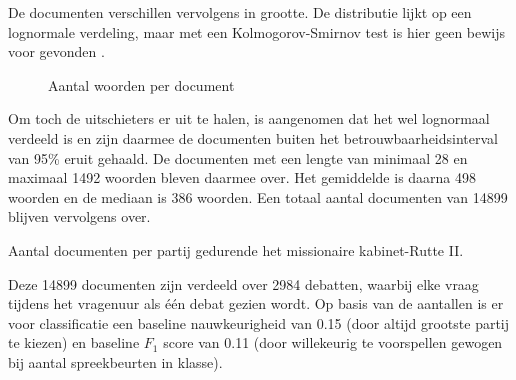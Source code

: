 De documenten verschillen vervolgens in grootte. De distributie lijkt op een lognormale verdeling, maar met een Kolmogorov-Smirnov test is hier geen bewijs voor gevonden \cite{Scipy}.

\begin{figure}[H]
    \centering
    \hspace*{-1in}
    \caption{Aantal woorden per document}%
    \label{fig:example}%
\end{figure}
Om toch de uitschieters er uit te halen, is aangenomen dat het wel lognormaal verdeeld is en zijn daarmee de documenten buiten het betrouwbaarheidsinterval van 95\% eruit gehaald. De documenten met een lengte van minimaal 28 en maximaal 1492 woorden bleven daarmee over. Het gemiddelde is daarna 498 woorden en de mediaan is 386 woorden. Een totaal aantal documenten van 14899 blijven vervolgens over.\par

\begin{table}[H]
\label{aantallen}
\caption{Aantal documenten per partij gedurende het missionaire kabinet-Rutte II.}
\centering

\end{table}
Deze 14899 documenten zijn verdeeld over 2984 debatten, waarbij elke vraag tijdens het vragenuur als één debat gezien wordt. Op basis van de aantallen is er voor classificatie een baseline nauwkeurigheid van 0.15 (door altijd grootste partij te kiezen) en baseline $F_1$ score van 0.11 (door willekeurig te voorspellen gewogen bij aantal spreekbeurten in klasse).\par



